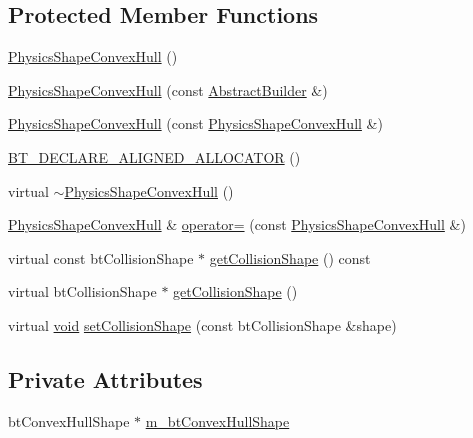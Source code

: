 \subsection*{Protected Member Functions}
\begin{DoxyCompactItemize}
\item 
\mbox{\hyperlink{classnjli_1_1_physics_shape_convex_hull_a363b041662a8c81f4e27ad2d3e56c5bb}{Physics\+Shape\+Convex\+Hull}} ()
\item 
\mbox{\hyperlink{classnjli_1_1_physics_shape_convex_hull_a6da6fd77ce73c59de118b71a9a3c1519}{Physics\+Shape\+Convex\+Hull}} (const \mbox{\hyperlink{classnjli_1_1_abstract_builder}{Abstract\+Builder}} \&)
\item 
\mbox{\hyperlink{classnjli_1_1_physics_shape_convex_hull_a860d30a92c8d7bc8b3718880c4e9768c}{Physics\+Shape\+Convex\+Hull}} (const \mbox{\hyperlink{classnjli_1_1_physics_shape_convex_hull}{Physics\+Shape\+Convex\+Hull}} \&)
\item 
\mbox{\hyperlink{classnjli_1_1_physics_shape_convex_hull_ada4b577fed72fdf40be9454d92c34ab7}{B\+T\+\_\+\+D\+E\+C\+L\+A\+R\+E\+\_\+\+A\+L\+I\+G\+N\+E\+D\+\_\+\+A\+L\+L\+O\+C\+A\+T\+OR}} ()
\item 
virtual \mbox{\hyperlink{classnjli_1_1_physics_shape_convex_hull_ad283854bf299d69f85495bd8cb78a9dc}{$\sim$\+Physics\+Shape\+Convex\+Hull}} ()
\item 
\mbox{\hyperlink{classnjli_1_1_physics_shape_convex_hull}{Physics\+Shape\+Convex\+Hull}} \& \mbox{\hyperlink{classnjli_1_1_physics_shape_convex_hull_a6fa6c108dece02f7076f7de56788fa58}{operator=}} (const \mbox{\hyperlink{classnjli_1_1_physics_shape_convex_hull}{Physics\+Shape\+Convex\+Hull}} \&)
\item 
virtual const bt\+Collision\+Shape $\ast$ \mbox{\hyperlink{classnjli_1_1_physics_shape_convex_hull_aa8378f7e3af08e778dce0b416c8e0bfa}{get\+Collision\+Shape}} () const
\item 
virtual bt\+Collision\+Shape $\ast$ \mbox{\hyperlink{classnjli_1_1_physics_shape_convex_hull_abd5ce039acdb2ff2654bbeb36db88ac4}{get\+Collision\+Shape}} ()
\item 
virtual \mbox{\hyperlink{_thread_8h_af1e856da2e658414cb2456cb6f7ebc66}{void}} \mbox{\hyperlink{classnjli_1_1_physics_shape_convex_hull_a0fbc71273b102cffdb224798d5cf0d49}{set\+Collision\+Shape}} (const bt\+Collision\+Shape \&shape)
\end{DoxyCompactItemize}
\subsection*{Private Attributes}
\begin{DoxyCompactItemize}
\item 
bt\+Convex\+Hull\+Shape $\ast$ \mbox{\hyperlink{classnjli_1_1_physics_shape_convex_hull_adf9e91ee0f43ffa85eb61ba6237c233d}{m\+\_\+bt\+Convex\+Hull\+Shape}}
\end{DoxyCompactItemize}
